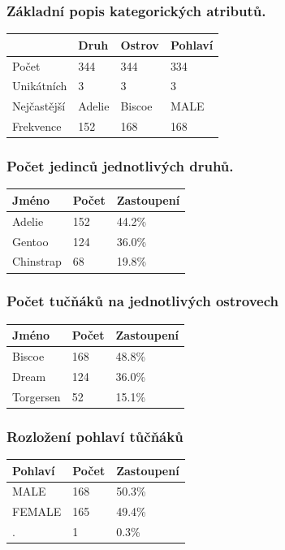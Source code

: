 \documentclass[10pt,xcolor=pdflatex,dvipsnames,table,oneside]{book}
\begin{document}
\subsubsection{Základní popis kategorických atributů.}
\vspace{1em}
\begin{tabular}{|l|l|l|l|}
    \hline
    & Druh & Ostrov & Pohlaví \\
    \hline
    \hline
    Počet & 344 & 344 & 334 \\
    \hline
    Unikátních & 3 & 3 & 3 \\
    \hline
    Nejčastější & Adelie & Biscoe & MALE \\
    \hline
    Frekvence & 152 & 168 & 168 \\
    \hline
\end{tabular}

\subsubsection{Počet jedinců jednotlivých druhů.}
\vspace{1em}
\begin{tabular}{|l|l|l|}
    \hline
    Jméno & Počet & Zastoupení \\
    \hline
    \hline
    Adelie & 152 & 44.2\% \\
    \hline
    Gentoo & 124 & 36.0\% \\
    \hline
    Chinstrap & 68 & 19.8\% \\
    \hline
\end{tabular}

\subsubsection{Počet tučňáků na jednotlivých ostrovech}
\vspace{1em}
\begin{tabular}{|l|l|l|}
    \hline
    Jméno & Počet & Zastoupení \\
    \hline
    \hline
    Biscoe    & 168 & 48.8\% \\
    \hline
    Dream     & 124 & 36.0\% \\
    \hline
    Torgersen & 52 & 15.1\% \\
    \hline
\end{tabular}

\subsubsection{Rozložení pohlaví tůčňáků}
\vspace{1em}
\begin{tabular}{|l|l|l|}
    \hline
    Pohlaví & Počet & Zastoupení \\
    \hline
    \hline
    MALE    & 168 & 50.3\% \\
    \hline
    FEMALE     & 165 & 49.4\% \\
    \hline
    . & 1 & 0.3\% \\
    \hline
\end{tabular}
\end{document}
